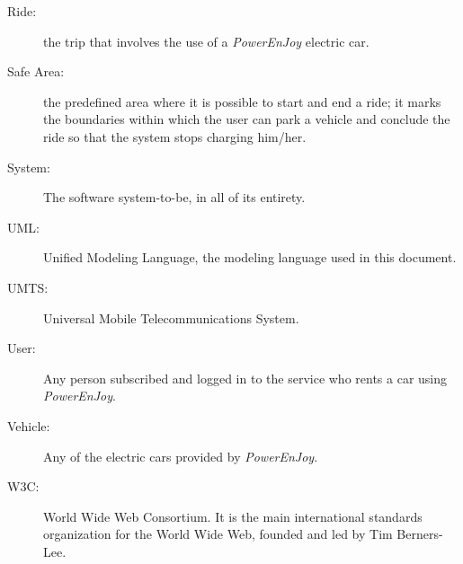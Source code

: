 \begin{description}
\item[Ride:] the trip that involves the use of a \emph{PowerEnJoy} electric car.
\item[Safe Area:] the predefined area where it is possible to start and end a ride; it marks the boundaries within which the user can park a vehicle and conclude the ride so that the system stops charging him/her.
\item[System:] The software system-to-be, in all of its entirety.
\item[UML:] Unified Modeling Language, the modeling language used in this document.
\item[UMTS:] Universal Mobile Telecommunications System.
\item[User:] Any person subscribed and logged in to the service who rents a car using \hbox{\emph{PowerEnJoy}}.
\item[Vehicle:] Any of the electric cars provided by \emph{PowerEnJoy}.
\item[W3C:] World Wide Web Consortium. It is the main international standards organization for the World Wide Web, founded and led by Tim Berners-Lee.
\end{description}

